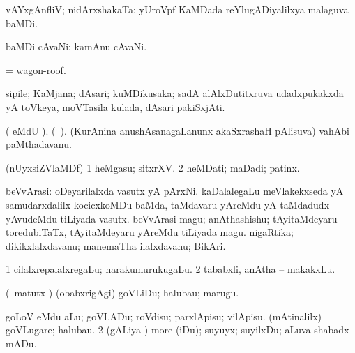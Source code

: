 \bentry
{} 
\gl{\nA}
\bmng
 vAYxgAnfliV; nidArxshakaTa; yUroVpf KaMDada reYlugADiyalilxya malaguva baMDi. 
\emng
\eentry

\bentry
{} 
\gl{\nA}
\expl{}
\bmng
baMDi cAvaNi; kamAnu cAvaNi. 
\emng
\eentry

\bentry
{} 
\gl{\nA}
\expl{}
\bmng
= \hyperlink{wagon-roof}{wagon-roof}. 
\emng
\eentry

\bentry
{} 
\gl{\nA}
\expl{}
\bmng
sipile; KaMjana; dAsari; kuMDikusaka; sadA alAlxDutitxruva udadxpukakxda yA toVkeya, moVTasila kulada, dAsari pakiSxjAti. 
\emng
\eentry

\bentry
{} 
\gl{\nA}
\expl{}
\bmng
( eMdU \parx). (\bava\ ). (KurAnina anushAsanagaLanunx akaSxrashaH pAlisuva) vahAbi paMthadavanu. 
\emng
\eentry

\bentry
{} 
\gl{\nA}
\bmng
(nUyxsiZVlaMDf) 
\bnum
\num{1} heMgasu; sitxrXV. 
\num{2} heMDati; maDadi; patinx. 
\enum
\emng
\eentry

\bentry
{} 
\gl{\nA}
\expl{}
\bmng
{} 
\emng
\eentry

\bentry
{} 
\gl{\nA}
\expl{}
\bmng
beVvArasi: 
\banum
{} oDeyarilalxda vasutx yA pArxNi. 
 kaDalalegaLu meVlakekxseda yA samudarxdalilx kocicxkoMDu baMda, taMdavaru yAreMdu yA taMdadudx yAvudeMdu tiLiyada vasutx. 
 beVvArasi magu; anAthashishu; tAyitaMdeyaru toredubiTaTx, tAyitaMdeyaru yAreMdu tiLiyada magu. 
 nigaRtika; dikikxlalxdavanu; manemaTha ilalxdavanu; BikAri. 
\eanum
\emng
\eentry

\bentry
{} 
\gl{\nA}
\expl{}
\bmng
\bnum
\num{1} cilalxrepalalxregaLu; harakumurukugaLu. 
\num{2} tababxli, anAtha -- makakxLu. 
\enum
\emng
\eentry

\bentry
{} 
\gl{\sakirx}
\expl{}
\bmng
(\kAparx\ matutx \alaMshA) (obabxrigAgi) goVLiDu; halubau; marugu. 
\emng

\noindent 
\gl{\akirx}
\expl{}
\bmng
\bnum
{} 
\banum
{} goLoV eMdu aLu; goVLADu; roVdisu; parxlApisu; vilApisu. 
 (mAtinalilx) goVLugare; halubau. 
\eanum
\numie
\num{2} (gALiya \vi) more (iDu); suyuyx; suyilxDu; aLuva shabadx mADu. 
\enum
\emng
\eentry

